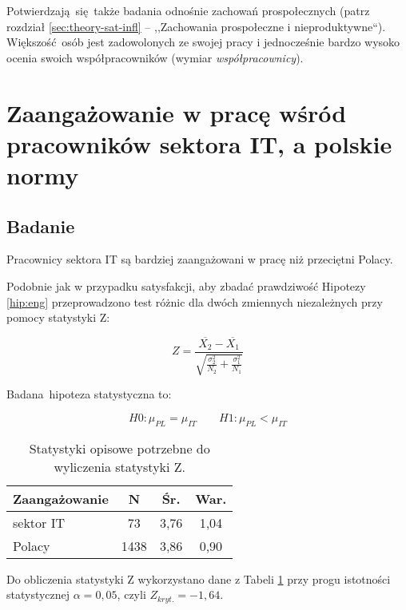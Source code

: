 Potwierdzają się także badania odnośnie zachowań prospołecznych (patrz rozdział \ref{sec:theory-sat-infl} -- ,,Zachowania prospołeczne i nieproduktywne``). Większość osób jest zadowolonych ze swojej pracy i jednocześnie bardzo wysoko ocenia swoich współpracowników (wymiar \textit{współpracownicy}).
\section{Zaangażowanie w pracę wśród pracowników sektora IT, a polskie normy}
\subsection{Badanie}
\begin{hyp}
  Pracownicy sektora IT są bardziej zaangażowani w pracę niż przeciętni Polacy.
  \label{hip:eng}
\end{hyp}

Podobnie jak w przypadku satysfakcji, aby zbadać prawdziwość Hipotezy \ref{hip:eng} przeprowadzono test różnic dla dwóch zmiennych niezależnych przy pomocy statystyki Z:

\begin{equation}
  Z = \frac{\overline{X_2} - \overline{X_1}}{\sqrt{\frac{\sigma^2_2}{N_2}+\frac{\sigma^2_1}{N_1}}}
\end{equation}

Badana hipoteza statystyczna  to:

\begin{equation}
  H0: \mu_{PL} = \mu_{IT} \qquad H1: \mu_{PL} < \mu_{IT}
\end{equation}

\begin{table}[h!]
  \begin{center}
    \begin{tabular}{l | c c c }
      Zaangażowanie & N & Śr. & War. \\ \hline
      sektor IT & 73 & 3,76 & 1,04 \\
      Polacy & 1438 & 3,86 & 0,90 \\
    \end{tabular}
  \end{center}
  \caption{Statystyki opisowe potrzebne do wyliczenia statystyki Z.}
  \label{tab:uwes-norms-data}
\end{table}

Do obliczenia statystyki Z wykorzystano dane z Tabeli \ref{tab:uwes-norms-data} przy progu istotności statystycznej $\alpha = 0,05$, czyli $Z_{kryt.} = -1,64$.

